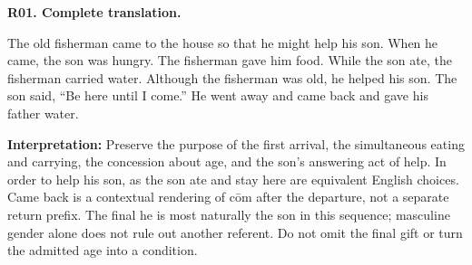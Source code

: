 \par\begin{minipage}{\linewidth}\raggedright
\textbf{R01. Complete translation.}

The old fisherman came to the house so that he might help his son. When he came, the son was hungry. The fisherman gave him food. While the son ate, the fisherman carried water. Although the fisherman was old, he helped his son. The son said, “Be here until I come.” He went away and came back and gave his father water.

\textbf{Interpretation:} Preserve the purpose of the first arrival, the simultaneous eating and carrying, the concession about age, and the son's answering act of help. In order to help his son, as the son ate and stay here are equivalent English choices. Came back is a contextual rendering of cōm after the departure, not a separate return prefix. The final he is most naturally the son in this sequence; masculine gender alone does not rule out another referent. Do not omit the final gift or turn the admitted age into a condition.

\end{minipage}\par\addvspace{4pt}

